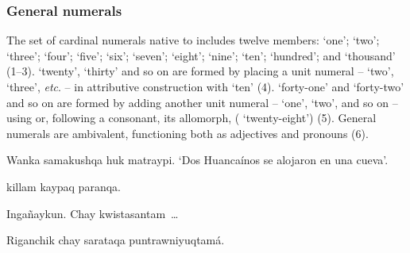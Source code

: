 {\subsubsection{General numerals}\label{ssec:gennum}
The set of cardinal numerals native to \SYQ{} includes twelve members:  `one';  `two';  `three';  `four';  `five';  `six';  `seven';  `eight';  `nine';  `ten';  `hundred'; and  `thousand' (1--3). `twenty', `thirty' and so on are formed by placing a unit numeral --  `two',  `three', \emph{etc}. -- in attributive construction with  `ten' (4). `forty-one' and `forty-two' and so on are formed by adding another unit numeral --  `one',  `two', and so on -- using  or, following a consonant, its allomorph,  ( `twenty-eight') (5). General numerals are ambivalent, functioning both as adjectives and pronouns (6).

%
{ Wanka samakushqa huk matraypi.}%
{}%
%
{`Dos Huanca\'inos se alojaron en una cueva'.}%
{}{}%

%
{ killam kaypaq paranqa.}%
{}%
{}{}%

%
{Inga\~naykun. Chay  kwistasantam~\dots{}}%
{}%
{}{}%

%
{Riganchik chay sarataqa   puntrawniyuqtam\'a.}%
{}%
{}{}%

}
